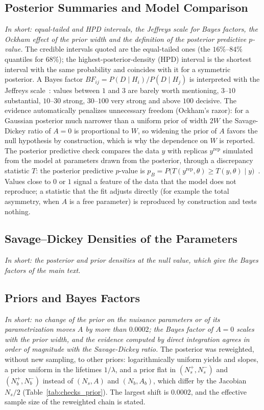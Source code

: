 \subsection{Posterior Summaries and Model Comparison}
\emph{In short: equal-tailed and HPD intervals, the Jeffreys scale for Bayes factors, the Ockham effect of the prior width and the definition of the posterior predictive $p$-value.}
The credible intervals quoted are the equal-tailed ones (the $16\%$--$84\%$ quantiles for $68\%$); the highest-posterior-density (HPD) interval is the shortest interval with the same probability and coincides with it for a symmetric posterior. A Bayes factor $BF_{ij}=P(D\mid H_i)/P(D\mid H_j)$ is interpreted with the Jeffreys scale~\cite{jeffreys,kass_raftery}: values between $1$ and $3$ are barely worth mentioning, $3$--$10$ substantial, $10$--$30$ strong, $30$--$100$ very strong and above $100$ decisive. The evidence automatically penalizes unnecessary freedom (Ockham's razor): for a Gaussian posterior much narrower than a uniform prior of width $2W$ the Savage-Dickey ratio of $A=0$ is proportional to $W$, so widening the prior of $A$ favors the null hypothesis by construction, which is why the dependence on $W$ is reported.
The posterior predictive check compares the data $y$ with replicas $y^{\mathrm{rep}}$ simulated from the model at parameters drawn from the posterior, through a discrepancy statistic $T$: the posterior predictive $p$-value is $p_B=P\big(T(y^{\mathrm{rep}},\theta)\geq T(y,\theta)\mid y\big)$~\cite{gelman_ppc}. Values close to $0$ or $1$ signal a feature of the data that the model does not reproduce; a statistic that the fit adjusts directly (for example the total asymmetry, when $A$ is a free parameter) is reproduced by construction and tests nothing.
\subsection{Savage--Dickey Densities of the Parameters}
\label{app:sd_densities}
\emph{In short: the posterior and prior densities at the null value, which give the Bayes factors of the main text.}

\subsection{Priors and Bayes Factors}
\label{sec:checks_prior}
\emph{In short: no change of the prior on the nuisance parameters or of its parametrization moves $A$ by more than $0.0002$; the Bayes factor of $A=0$ scales with the prior width, and the evidence computed by direct integration agrees in order of magnitude with the Savage-Dickey ratio.}
The posterior was reweighted, without new sampling, to other priors: logarithmically uniform yields and slopes, a prior uniform in the lifetimes $1/\lambda$, and a prior flat in $(N_s^+,N_s^-)$ and $(N_b^+,N_b^-)$ instead of $(N_s,A)$ and $(N_b,A_b)$, which differ by the Jacobian $N_s/2$ (Table~\ref{tab:checks_prior}). The largest shift is $0.0002$, and the effective sample size of the reweighted chain is stated.

